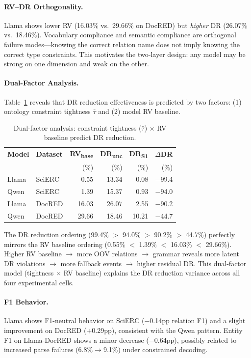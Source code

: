 \documentclass[11pt,a4paper]{article}
\begin{document}
\paragraph{RV--DR Orthogonality.} Llama shows lower RV (16.03\% vs.\ 29.66\% on DocRED) but \emph{higher} DR (26.07\% vs.\ 18.46\%). Vocabulary compliance and semantic compliance are orthogonal failure modes---knowing the correct relation name does not imply knowing the correct type constraints. This motivates the two-layer design: any model may be strong on one dimension and weak on the other.

\paragraph{Dual-Factor Analysis.} Table~\ref{tab:dual-factor} reveals that DR reduction effectiveness is predicted by two factors: (1) ontology constraint tightness $\bar{\tau}$ and (2) model RV baseline.

\begin{table}[t]
\centering
\small
\caption{Dual-factor analysis: constraint tightness ($\bar{\tau}$) $\times$ RV baseline predict DR reduction.}
\label{tab:dual-factor}
\begin{tabular}{llrrrr}
\toprule
\textbf{Model} & \textbf{Dataset} & \textbf{RV\textsubscript{base}} & \textbf{DR\textsubscript{unc}} & \textbf{DR\textsubscript{S1}} & \textbf{$\Delta$DR} \\
 & & (\%) & (\%) & (\%) & (\%) \\
\midrule
Llama & SciERC & 0.55 & 13.34 & 0.08 & $-$99.4 \\
Qwen & SciERC & 1.39 & 15.37 & 0.93 & $-$94.0 \\
Llama & DocRED & 16.03 & 26.07 & 2.55 & $-$90.2 \\
Qwen & DocRED & 29.66 & 18.46 & 10.21 & $-$44.7 \\
\bottomrule
\end{tabular}
\end{table}

The DR reduction ordering (99.4\% $>$ 94.0\% $>$ 90.2\% $>$ 44.7\%) perfectly mirrors the RV baseline ordering (0.55\% $<$ 1.39\% $<$ 16.03\% $<$ 29.66\%). Higher RV baseline $\to$ more OOV relations $\to$ grammar reveals more latent DR violations $\to$ more fallback events $\to$ higher residual DR. This dual-factor model (tightness $\times$ RV baseline) explains the DR reduction variance across all four experimental cells.

\paragraph{F1 Behavior.} Llama shows F1-neutral behavior on SciERC ($-$0.14pp relation F1) and a slight improvement on DocRED ($+$0.29pp), consistent with the Qwen pattern. Entity F1 on Llama-DocRED shows a minor decrease ($-$0.64pp), possibly related to increased parse failures (6.8\%$\to$9.1\%) under constrained decoding.
\end{document}
